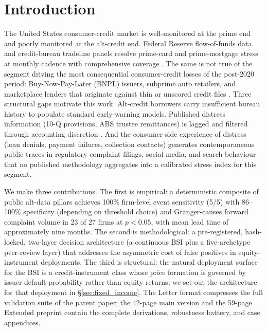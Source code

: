 \documentclass[11pt,a4paper]{article}
\begin{document}
\vspace{0.5em}

\section{Introduction}\label{sec:intro}

The United States consumer-credit market is well-monitored at the prime end and poorly monitored at the alt-credit end. Federal Reserve flow-of-funds data and credit-bureau tradeline panels resolve prime-card and prime-mortgage stress at monthly cadence with comprehensive coverage \citep{frb2023householdcredit}. The same is not true of the segment driving the most consequential consumer-credit losses of the post-2020 period: Buy-Now-Pay-Later (BNPL) issuers, subprime auto retailers, and marketplace lenders that originate against thin or unscored credit files \citep{difilippo2018marketplace,beck2024bnpl}. Three structural gaps motivate this work. Alt-credit borrowers carry insufficient bureau history to populate standard early-warning models. Published distress information (10-Q provisions, ABS trustee remittances) is lagged and filtered through accounting discretion \citep{adelinoschoar2016}. And the consumer-side experience of distress (loan denials, payment failures, collection contacts) generates contemporaneous public traces in regulatory complaint filings, social media, and search behaviour that no published methodology aggregates into a calibrated stress index for this segment.

We make three contributions. The first is empirical: a deterministic composite of public alt-data pillars achieves 100\% firm-level event sensitivity (5/5) with 86--100\% specificity (depending on threshold choice) and Granger-causes forward complaint volume in 23 of 27 firms at $p < 0.05$, with mean lead time of approximately nine months. The second is methodological: a pre-registered, hash-locked, two-layer decision architecture (a continuous BSI plus a five-archetype peer-review layer) that addresses the asymmetric cost of false positives in equity-instrument deployments. The third is structural: the natural deployment surface for the BSI is a credit-instrument class whose price formation is governed by issuer default probability rather than equity returns; we set out the architecture for that deployment in §\ref{sec:fixed_income}. The Letter format compresses the full validation suite of the parent paper; the 42-page main version and the 59-page Extended preprint contain the complete derivations, robustness battery, and case appendices.
\end{document}
